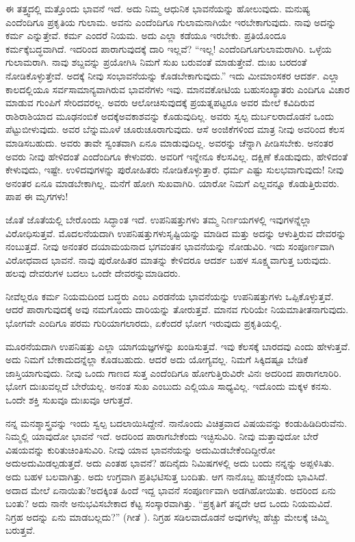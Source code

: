 ಈ ತತ್ತ್ವದಲ್ಲಿ ಮತ್ತೊಂದು ಭಾವನೆ ಇದೆ. ಅದು ನಿಮ್ಮ ಆಧುನಿಕ ಭಾವನೆಯನ್ನು ಹೋಲುವುದು. ಮನುಷ್ಯ ಎಂದೆಂದಿಗೂ ಪ್ರಕೃತಿಯ ಗುಲಾಮ. ಅವನು ಎಂದೆಂದಿಗೂ ಗುಲಾಮನಾಗಿಯೇ ಇರಬೇಕಾಗುವುದು. ನಾವು ಅದನ್ನು ಕರ್ಮ ಎನ್ನುತ್ತೇವೆ. ಕರ್ಮ ಎಂದರೆ ನಿಯಮ. ಅದು ಎಲ್ಲಾ ಕಡೆಯೂ ಇರಬೇಕು. ಪ್ರತಿಯೊಂದೂ ಕರ್ಮಕ್ಕೆ\break ಬದ್ಧವಾಗಿದೆ. ಇದರಿಂದ ಪಾರಾಗುವುದಕ್ಕೆ ದಾರಿ ಇಲ್ಲವೆ? “ಇಲ್ಲ! ಎಂದೆಂದಿಗೂ\break ಗುಲಾಮರಾಗಿರಿ. ಒಳ್ಳೆಯ ಗುಲಾಮರಾಗಿ. ನಾವು ಶಬ್ದವನ್ನು ಪ್ರಯೋಗಿಸಿ ನಿಮಗೆ ಸುಖ ಬರುವಂತೆ ಮಾಡುತ್ತೇವೆ. ದುಃಖ ಬರದಂತೆ ನೋಡಿಕೊಳ್ಳುತ್ತೇವೆ. ಅದಕ್ಕೆ ನೀವು ಸಂಭಾವನೆಯನ್ನು ಕೊಡಬೇಕಾಗುವುದು.” ಇದು ಮೀಮಾಂಸಕರ ಆದರ್ಶ. ಎಲ್ಲಾ ಕಾಲದಲ್ಲಿಯೂ ಸರ್ವ\-ಸಾಮಾನ್ಯವಾಗಿರುವ ಭಾವನೆಗಳು ಇವು. ಮಾನವಕೋಟಿಯ ಬಹುಸಂಖ್ಯಾತರು ಎಂದಿಗೂ ವಿಚಾರ ಮಾಡುವ ಗುಂಪಿಗೆ ಸೇರಿದವರಲ್ಲ. ಅವರು ಆಲೋಚಿಸುವುದಕ್ಕೆ ಪ್ರಯತ್ನಪಟ್ಟರೂ ಅವರ ಮೇಲೆ ಕವಿದಿರುವ ರಾಶಿರಾಶಿಯಾದ ಮೂಢನಂಬಿಕೆ ಅದಕ್ಕೆ\break ಅವಕಾಶವನ್ನು ಕೊಡುವುದಿಲ್ಲ. ಅವರು ಸ್ವಲ್ಪ ದುರ್ಬಲರಾದೊಡನೆ ಒಂದು ಪೆಟ್ಟು\break ಬೀಳುವುದು. ಅವರ ಬೆನ್ನುಮೂಳೆ ಚೂರುಚೂರಾಗುವುದು. ಆಸೆ ಅಂಜಿಕೆಗಳಿಂದ ಮಾತ್ರ ನೀವು ಅವರಿಂದ ಕೆಲಸ ಮಾಡಿಸಬಹುದು. ಅವರು ತಾವೇ ಸ್ವಂತವಾಗಿ ಏನೂ ಮಾಡುವುದಿಲ್ಲ. ಅವರನ್ನು ಚೆನ್ನಾಗಿ ಪೀಡಿಸಬೇಕು. ಅನಂತರ ಅವರು ನೀವು ಹೇಳಿದಂತೆ ಎಂದೆಂದಿಗೂ ಕೇಳುವರು. ಅವರಿಗೆ ಇನ್ನೇನೂ ಕೆಲಸವಿಲ್ಲ. ದಕ್ಷಿಣೆ ಕೊಡುವುದು, ಹೇಳಿದಂತೆ ಕೇಳುವುದು, ಇಷ್ಟೇ. ಉಳಿದವುಗಳನ್ನು ಪುರೋಹಿತರು ನೋಡಿಕೊಳ್ಳುತ್ತಾರೆ. ಧರ್ಮ ಎಷ್ಟು ಸುಲಭವಾಗುವುದು! ನೀವು ಅನಂತರ ಏನೂ ಮಾಡಬೇಕಾಗಿಲ್ಲ. ಮನೆಗೆ ಹೋಗಿ ಸುಖವಾಗಿರಿ. ಯಾರೋ ನಿಮಗೆ ಎಲ್ಲವನ್ನೂ ಕೊಡುತ್ತಿರುವರು. ಪಾಪ ಈ ಮೃಗಗಳು!

ಜೊತೆ ಜೊತೆಯಲ್ಲಿ ಬೇರೊಂದು ಸಿದ್ಧಾಂತ ಇದೆ. ಉಪನಿಷತ್ತುಗಳು ತಮ್ಮ ನಿರ್ಣಯಗಳಲ್ಲಿ ಇವುಗಳನ್ನೆಲ್ಲಾ ವಿರೋಧಿಸುತ್ತವೆ. ಮೊದಲನೆಯದಾಗಿ ಉಪನಿಷತ್ತುಗಳು\break ಸೃಷ್ಟಿಯನ್ನು ಮಾಡಿದ ಮತ್ತು ಅದನ್ನು ಆಳುತ್ತಿರುವ ದೇವರನ್ನು ನಂಬುತ್ತದೆ. ನೀವು ಅನಂತರ ದಯಾಮಯನಾದ ಭಗವಂತನ ಭಾವನೆಯನ್ನು ನೋಡುವಿರಿ. ಇದು ಸಂಪೂರ್ಣವಾಗಿ ವಿರೋಧವಾದ ಭಾವನೆ. ನಾವು ಪುರೋಹಿತರ ಮಾತನ್ನು ಕೇಳಿದರೂ ಆದರ್ಶ ಬಹಳ ಸೂಕ್ಷ್ಮವಾಗುತ್ತ ಬರುವುದು. ಹಲವು ದೇವರುಗಳ ಬದಲು ಒಂದೇ ದೇವರನ್ನು\break ಮಾಡಿದರು.

ನೀವೆಲ್ಲರೂ ಕರ್ಮ ನಿಯಮದಿಂದ ಬದ್ಧರು ಎಂಬ ಎರಡನೆಯ ಭಾವನೆಯನ್ನು ಉಪನಿಷತ್ತುಗಳು ಒಪ್ಪಿಕೊಳ್ಳುತ್ತವೆ. ಆದರೆ ಪಾರಾಗುವುದಕ್ಕೆ ಅವು ನಮಗೊಂದು ದಾರಿಯನ್ನು ತೋರುತ್ತವೆ. ಮಾನವ ಗುರಿಯೇ ನಿಯಮಾತೀತನಾಗುವುದು. ಭೋಗವೇ ಎಂದಿಗೂ ಪರಮ ಗುರಿಯಾಗಲಾರದು, ಏಕೆಂದರೆ ಭೋಗ ಇರುವುದು ಪ್ರಕೃತಿಯಲ್ಲಿ.

ಮೂರನೆಯದಾಗಿ ಉಪನಿಷತ್ತು ಎಲ್ಲಾ ಯಾಗಯಜ್ಞಗಳನ್ನು ಖಂಡಿಸುತ್ತವೆ. ಇವು ಕೆಲಸಕ್ಕೆ ಬಾರದವು ಎಂದು ಹೇಳುತ್ತವೆ. ಅದು ನಿಮಗೆ ಬೇಕಾದುದನ್ನೆಲ್ಲಾ ಕೊಡಬಹುದು. ಆದರೆ ಅದು ಯೋಗ್ಯವಲ್ಲ. ನಿಮಗೆ ಸಿಕ್ಕಿದಷ್ಟೂ ಬೇಡಿಕೆ ಜಾಸ್ತಿಯಾಗುವುದು. ನೀವು ಒಂದು ಗಾಣದ ಸುತ್ತ ಎಂದೆಂದಿಗೂ ಹೋಗುತ್ತಿರುವಿರೇ ವಿನಃ ಅದರಿಂದ ಪಾರಾಗಲಾರಿರಿ. ಭೋಗ ದುಃಖವಲ್ಲದೆ ಬೇರೆಯಲ್ಲ. ಅನಂತ ಸುಖ ಎಂಬುದು ಎಲ್ಲಿಯೂ ಸಾಧ್ಯವಿಲ್ಲ. ಇದೊಂದು ಮಕ್ಕಳ ಕನಸು. ಒಂದೇ ಶಕ್ತಿ ಸುಖವೂ ದುಃಖವೂ ಆಗುತ್ತದೆ.

ನನ್ನ ಮನಶ್ಶಾಸ್ತ್ರವನ್ನು ಇಂದು ಸ್ವಲ್ಪ ಬದಲಾಯಿಸಿದ್ದೇನೆ. ನಾನೊಂದು ವಿಚಿತ್ರವಾದ ವಿಷಯವನ್ನು ಕಂಡುಹಿಡಿದಿರುವೆನು. ನಿಮ್ಮಲ್ಲಿ ಯಾವುದೋ ಭಾವನೆ ಇದೆ. ಅದರಿಂದ ಪಾರಾಗಬೇಕೆಂದು ಇಚ್ಛಿಸುವಿರಿ. ನೀವು ಮತ್ತಾವುದೋ ಬೇರೆ ವಿಷಯವನ್ನು ಕುರಿತು\break ಚಿಂತಿಸುವಿರಿ. ನೀವು ಯಾವ ಭಾವನೆಯನ್ನು ಅದುಮಿಡಬೇಕೆಂದಿದ್ದೀರೋ ಅದು\break ಅದುಮಿಡಲ್ಪಡುತ್ತದೆ. ಅದು ಎಂತಹ ಭಾವನೆ? ಹದಿನೈದು ನಿಮಿಷಗಳಲ್ಲಿ ಅದು ಬಂದು ನನ್ನನ್ನು ಅಪ್ಪಳಿಸಿತು. ಅದು ಬಹಳ ಬಲವಾಗಿತ್ತು. ಅದು ಉಗ್ರವಾಗಿ ಪ್ರತಿಭಟಿಸುತ್ತ ಬಂದಿತು. ಆಗ ನಾನೊಬ್ಬ ಹುಚ್ಚನೆಂದು ಭಾವಿಸಿದೆ. ಅದಾದ ಮೇಲೆ ಏನಾಯಿತು?\break ಅದಕ್ಕಿಂತ ಹಿಂದೆ ಇದ್ದ ಭಾವನೆ ಸಂಪೂರ್ಣವಾಗಿ ಅಡಗಿಹೋಯಿತು. ಅದರಿಂದ ಏನು ಬಂತು? ಅದು ನಾನೇ ಅನುಭವಿಸಬೇಕಾದ ಕೆಟ್ಟ ಸಂಸ್ಕಾರವಾಗಿತ್ತು. “ಪ್ರಕೃತಿಗೆ ತನ್ನದೇ ಆದ ಒಂದು ನಿಯಮವಿದೆ. ನಿಗ್ರಹ ಅದನ್ನು ಏನು ಮಾಡಬಲ್ಲದು?” (ಗೀತೆ ). ನಿಗ್ರಹ ಸಡಿಲವಾದೊಡನೆ ಅವುಗಳೆಲ್ಲ ಹೆಚ್ಚು ಮೇಲಕ್ಕೆ ಚಿಮ್ಮಿ ಬರುತ್ತವೆ.

